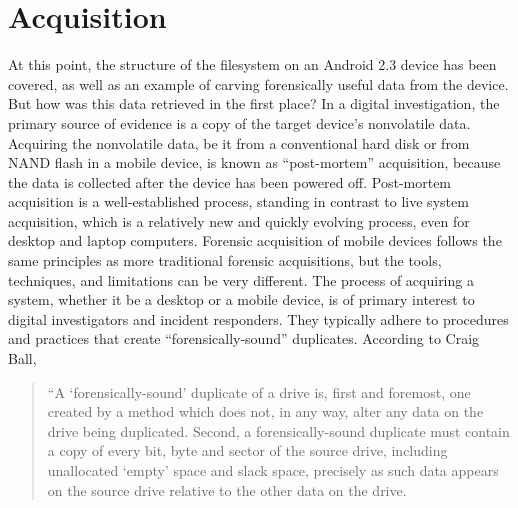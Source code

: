 \section{Acquisition}
At this point, the structure of the filesystem on an Android 2.3 device has been covered, as well as an example of carving
forensically useful data from the device. But how was this data retrieved in the first place? In a digital investigation, the
primary source of evidence is a copy of the target device's nonvolatile data.  Acquiring the nonvolatile data, be it from a
conventional hard disk or from NAND flash in a mobile device, is known as ``post-mortem'' acquisition, because the data is
collected after the device has been powered off.  Post-mortem acquisition is a well-established process, standing in contrast to
live system acquisition, which is a relatively new and quickly evolving process, even for desktop and laptop computers.  Forensic
acquisition of mobile devices follows the same principles as more traditional forensic acquisitions, but the tools, techniques, and
limitations can be very different. The process of acquiring a system, whether it be a desktop or a mobile device, is of primary
interest to digital investigators and incident responders. They typically adhere to procedures and practices that create
``forensically-sound'' duplicates.  According to Craig Ball, 

\begin{quote}
“A ‘forensically-sound’ duplicate of a drive is, first and foremost, one created by a method which does not, in any way, alter any data on the drive being duplicated. 
Second, a forensically-sound duplicate must contain a copy of every bit, byte and sector of the source drive, including unallocated ‘empty’ space and slack space, precisely as such data appears on the source drive relative to the other data on the drive. 

\hspace{\fill}\cite{ball}
\end{quote}

